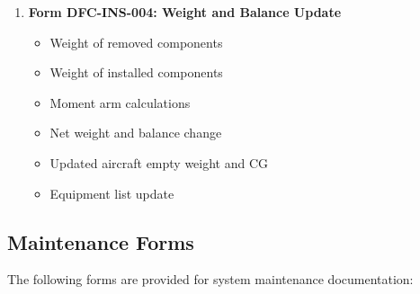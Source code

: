 \documentclass[12pt,a4paper,twoside,openright]{book}
\begin{document}
\begin{enumerate}
    \item \textbf{Form DFC-INS-004: Weight and Balance Update}
    \begin{itemize}
        \item Weight of removed components
        \item Weight of installed components
        \item Moment arm calculations
        \item Net weight and balance change
        \item Updated aircraft empty weight and CG
        \item Equipment list update
    \end{itemize}
\end{enumerate}

\subsection{Maintenance Forms}

The following forms are provided for system maintenance documentation:
\end{document}
